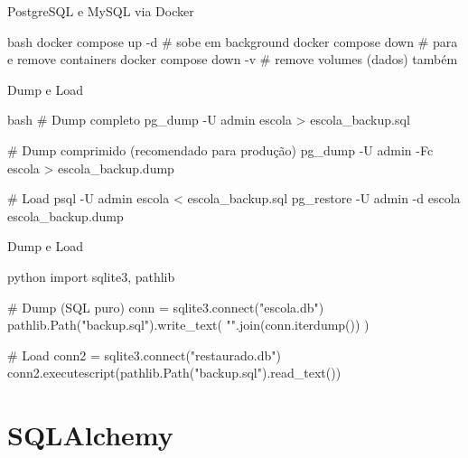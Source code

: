 \documentclass[xcolor=dvipsnames,t,aspectratio=169]{beamer}
\begin{document}
\begin{frame}[c, fragile]{PostgreSQL e MySQL via Docker}

\begin{code}{bash}
docker compose up -d      # sobe em background
docker compose down       # para e remove containers
docker compose down -v    # remove volumes (dados) também
\end{code}

\end{frame}


\begin{frame}[c, fragile]{Dump e Load}

\begin{code}[PostgreSQL]{bash}
# Dump completo
pg_dump -U admin escola > escola_backup.sql

# Dump comprimido (recomendado para produção)
pg_dump -U admin -Fc escola > escola_backup.dump

# Load
psql -U admin escola < escola_backup.sql
pg_restore -U admin -d escola escola_backup.dump
\end{code}

\end{frame}

\begin{frame}[c, fragile]{Dump e Load}

\begin{code}[SQLite]{python}
import sqlite3, pathlib

# Dump (SQL puro)
conn = sqlite3.connect("escola.db")
pathlib.Path("backup.sql").write_text(
    "\n".join(conn.iterdump())
)

# Load
conn2 = sqlite3.connect("restaurado.db")
conn2.executescript(pathlib.Path("backup.sql").read_text())
\end{code}

\end{frame}


\section{SQLAlchemy}
\end{document}
